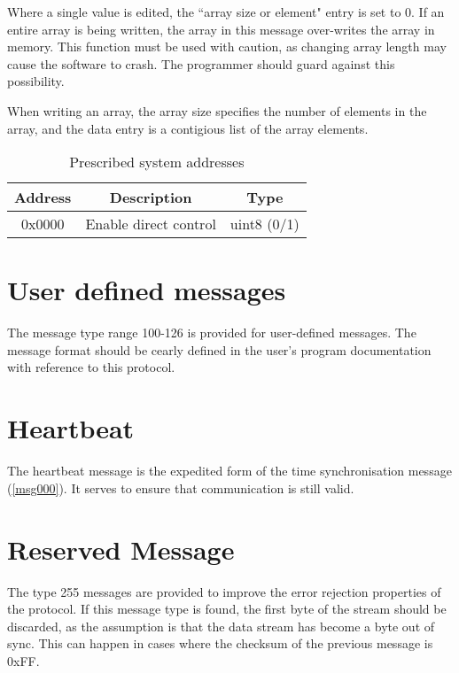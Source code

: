 Where a single value is edited, the ``array size or element" entry is set to 0. If an entire array is being written, the array in this message over-writes the array in memory. This function must be used with caution, as changing array length may cause the software to crash. The programmer should guard against this possibility.

When writing an array, the array size specifies the number of elements in the array, and the data entry is a contigious list of the array elements.

\begin{table}[H]
  \centering
  \begin{tabular}{ c c c }
  Address & Description & Type \\
\hline
  0x0000   & Enable direct control & uint8 (0/1) \\
  \end{tabular}
  \caption{Prescribed system addresses}
  \label{tab:svu:prescribed}
\end{table}

\section{User defined messages}
\label{msg-user}
The message type range 100-126 is provided for user-defined messages. The message format should be cearly defined in the user's program documentation with reference to this protocol.

\section{Heartbeat}
\label{msg128}
The heartbeat message is the expedited form of the time synchronisation message (\ref{msg000}). It serves to ensure that communication is still valid.

\section{Reserved Message}
\label{msg255}
The type 255 messages are provided to improve the error rejection properties of the protocol. If this message type is found, the first byte of the stream should be discarded, as the assumption is that the data stream has become a byte out of sync. This can happen in cases where the checksum of the previous message is 0xFF.
